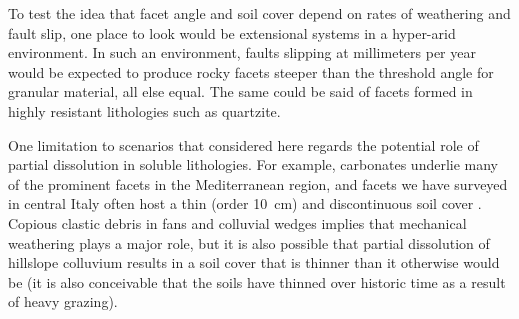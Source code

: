 
To test the idea that facet angle and soil cover depend on rates of weathering and fault slip, one place to look would be extensional systems in a hyper-arid environment. In such an environment, faults slipping at millimeters per year would be expected to produce rocky facets steeper than the threshold angle for granular material, all else equal. The same could be said of facets formed in highly resistant lithologies such as quartzite.

One limitation to scenarios that considered here regards the potential role of partial dissolution in soluble lithologies. For example, carbonates underlie many of the prominent facets in the Mediterranean region, and facets we have surveyed in central Italy often host a thin (order 10~cm) and discontinuous soil cover \citep{tucker2011geomorphic}. Copious clastic debris in fans and colluvial wedges implies that mechanical weathering plays a major role, but it is also possible that partial dissolution of hillslope colluvium results in a soil cover that is thinner than it otherwise would be (it is also conceivable that the soils have thinned over historic time as a result of heavy grazing).

